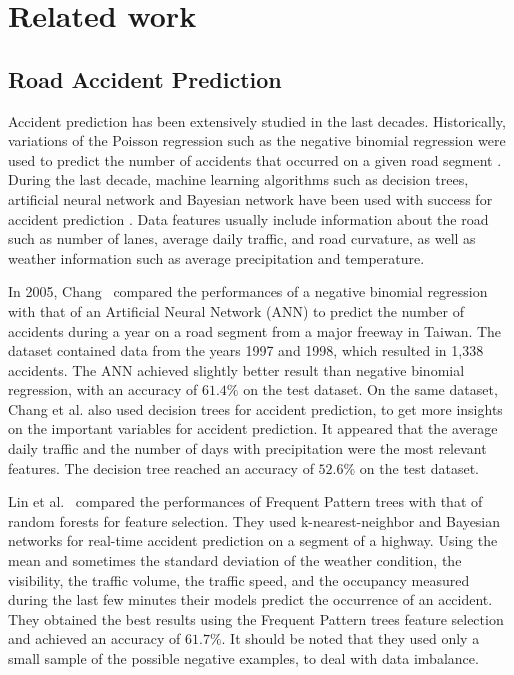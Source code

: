 \documentclass[conference]{IEEEtran}
\begin{document}
\section{Related work}
\subsection{Road Accident Prediction}
Accident prediction has been extensively studied in the last decades.
Historically, variations of the Poisson regression such as the negative
binomial regression were used to predict the number of accidents that
occurred on a given road segment \cite{Milton1998}. During the last decade,
machine learning algorithms such as decision trees, artificial neural network
and Bayesian network have been used with success for accident prediction
\cite{Chang2005, Chang2005b, Lin2015, Theofilatos2017}.
Data features usually include information about the road such as number of
lanes, average daily traffic, and road curvature, as well as weather
information such as average precipitation and temperature. 

In 2005,
Chang~\cite{Chang2005} compared the performances of a negative binomial
regression with that of an Artificial Neural Network (ANN) to predict the number
of accidents during a year on a road segment from a major freeway in
Taiwan. The dataset contained data from the years 1997 and 1998, which
resulted in 1,338 accidents. The ANN achieved slightly better result than negative 
binomial regression, with
an accuracy of $61.4\%$ on the test dataset. On the same dataset, Chang et
al.\cite{Chang2005b} also used decision trees for accident prediction,
 to get more insights on the important variables for accident
prediction. It appeared that the average daily traffic and the number of
days with precipitation were the most relevant features. The decision tree
reached an accuracy of $52.6\%$ on the test dataset. 

Lin et
al.~\cite{Lin2015} compared the performances of Frequent Pattern trees\cite{Han2004} with
that of random forests for feature selection. They used k-nearest-neighbor
and Bayesian networks for real-time accident prediction on a segment of
a highway. Using the mean and sometimes the standard deviation of the weather condition, the visibility, the traffic volume, the traffic speed, and the occupancy measured during the last few minutes their models predict the occurrence of an accident. They obtained
the best results using the Frequent Pattern trees feature selection and achieved
an accuracy of $61.7\%$. It should be noted that they used only a small sample of the
possible negative examples, to deal with data imbalance. 
\end{document}
